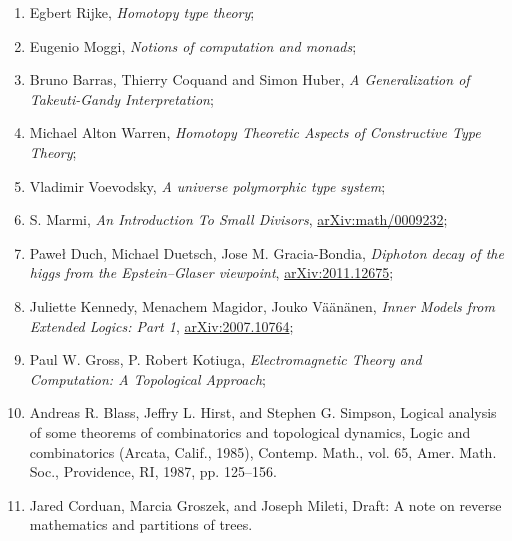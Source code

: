 \documentclass[a4paper,11pt]{article}
\begin{document}
\begin{enumerate}
\item Egbert Rijke, \textit{Homotopy type theory};



\item Eugenio Moggi, \textit{Notions of computation and monads};



\item Bruno Barras, Thierry Coquand and Simon Huber, \textit{A
    Generalization of Takeuti-Gandy Interpretation};



\item Michael Alton Warren, \textit{Homotopy Theoretic Aspects of
    Constructive Type Theory};



\item Vladimir Voevodsky, \textit{A universe polymorphic type system};



\item S. Marmi, \textit{An Introduction To Small Divisors},
  \href{https://arxiv.org/abs/math/0009232v1}{arXiv:math/0009232};



\item Paweł Duch, Michael Duetsch, Jose M. Gracia-Bondia,
  \textit{Diphoton decay of the higgs from the Epstein--Glaser
    viewpoint},
  \href{https://arxiv.org/abs/2011.12675v2}{arXiv:2011.12675};



\item Juliette Kennedy, Menachem Magidor, Jouko V\"{a}\"{a}n\"{a}nen,
  \textit{Inner Models from Extended Logics: Part 1},
  \href{https://arxiv.org/abs/2007.10764}{arXiv:2007.10764};



\item Paul W. Gross, P. Robert Kotiuga, \textit{Electromagnetic Theory
    and Computation: A Topological Approach};



\item Andreas R. Blass, Jeffry L. Hirst, and Stephen G. Simpson,
  Logical analysis of some theorems of combinatorics and topological
  dynamics, Logic and combinatorics (Arcata, Calif., 1985), Contemp.
  Math., vol. 65, Amer. Math. Soc., Providence, RI, 1987, pp. 125–156.



\item Jared Corduan, Marcia Groszek, and Joseph Mileti, Draft: A note
  on reverse mathematics and partitions of trees.




\end{enumerate}
\end{document}
